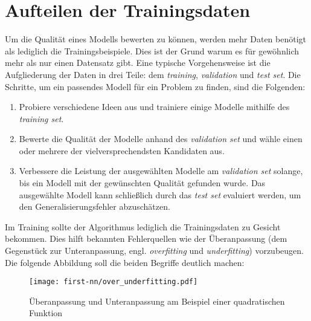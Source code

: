 \section{Aufteilen der Trainingsdaten}
\label{sec:split-train-data}
Um die Qualität eines Modells bewerten zu können, werden
mehr Daten benötigt als lediglich die Trainingsbeispiele.
Dies ist der Grund warum es für gewöhnlich mehr als nur einen
Datensatz gibt. Eine typische Vorgehensweise ist die Aufgliederung der Daten
in drei Teile: dem \textit{training}, \textit{validation} und \textit{test set}.
Die Schritte, um ein passendes Modell für ein Problem zu finden, sind die Folgenden:
\begin{enumerate}
  \item Probiere verschiedene Ideen aus und trainiere einige Modelle mithilfe des
        \textit{training set}.
  \item Bewerte die Qualität der Modelle anhand des \textit{validation set} und wähle
        einen oder mehrere der vielversprechendsten Kandidaten aus.
  \item Verbessere die Leistung der ausgewählten Modelle am \textit{validation set}
        solange, bis ein Modell mit der gewünschten Qualität gefunden wurde.
        Das ausgewählte Modell kann schließlich durch das
        \textit{test set} evaluiert werden, um den Generalisierungsfehler abzuschätzen.
\end{enumerate}
Im Training sollte der Algorithmus lediglich die Trainingsdaten
zu Gesicht bekommen. Dies hilft bekannten
Fehlerquellen wie der Überanpassung (dem Gegenstück zur Unteranpassung, engl.
\textit{overfitting} und \textit{underfitting}) vorzubeugen.
Die folgende Abbildung soll die beiden Begriffe deutlich machen:
\begin{figure}[h!]
  \centering
  \texttt{[image: first-nn/over\_underfitting.pdf]}
  \caption{Überanpassung und Unteranpassung am Beispiel einer
  quadratischen Funktion \parencite[131]{book:hands-on-ml}}
\end{figure}


